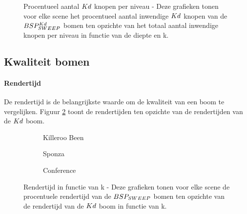 \begin{figure}
\begin{subfigure}[t]{0.32\linewidth}
\end{subfigure}
\begin{subfigure}[t]{0.32\linewidth}
\centering
{}
\end{subfigure}
\begin{subfigure}[t]{0.32\linewidth}
\centering
{}
\end{subfigure}
\caption[Procentueel aantal $\symKd$ knopen per niveau]{Procentueel aantal $\symKd$ knopen per niveau - \small Deze grafieken tonen voor elke scene het procentueel aantal inwendige $\symKd$ knopen van de $BSP^{Kd}_{SWEEP}$ bomen ten opzichte van het totaal aantal inwendige knopen per niveau in functie van de diepte en k.}
\label{fig:k-kd-knopen-diepte}
\end{figure}

\subsection{Kwaliteit bomen}
\label{h5-richtingen-kwaliteit}
\paragraph{Rendertijd}
De rendertijd is de belangrijkste waarde om de kwaliteit van een boom te vergelijken. Figuur \ref{fig:k-rendertijd} toont de rendertijden ten opzichte van de rendertijden van de $\symKd$ boom.
\begin{figure}
  \centering
  \begin{subfigure}[t]{.32\linewidth}
    \centering
{}
\caption{Killeroo Been}
  \end{subfigure}
  \begin{subfigure}[t]{.32\linewidth}
    \centering
{}
\caption{Sponza}
\end{subfigure}
\begin{subfigure}[t]{.32\linewidth}
  \centering
{}
\caption{Conference}
\end{subfigure}
\caption[Rendertijd in functie van k]{Rendertijd in functie van k - \small Deze grafieken tonen voor elke scene de procentuele rendertijd van de $BSP_{SWEEP}$ bomen ten opzichte van de rendertijd van de $\symKd$ boom in functie van k.}
\label{fig:k-rendertijd}
\end{figure}

